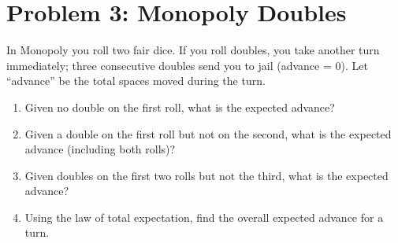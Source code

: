 \vspace{1em}
\hrulefill

\section*{Problem 3: Monopoly Doubles}
In Monopoly you roll two fair dice. If you roll doubles, you take another turn immediately; three consecutive doubles send you to jail (advance = 0). Let ``advance'' be the total spaces moved during the turn.
\begin{enumerate}[label=\arabic*.]
    \item Given no double on the first roll, what is the expected advance?
    \item Given a double on the first roll but not on the second, what is the expected advance (including both rolls)?
    \item Given doubles on the first two rolls but not the third, what is the expected advance?
    \item Using the law of total expectation, find the overall expected advance for a turn.
\end{enumerate}

\medskip
\solution

